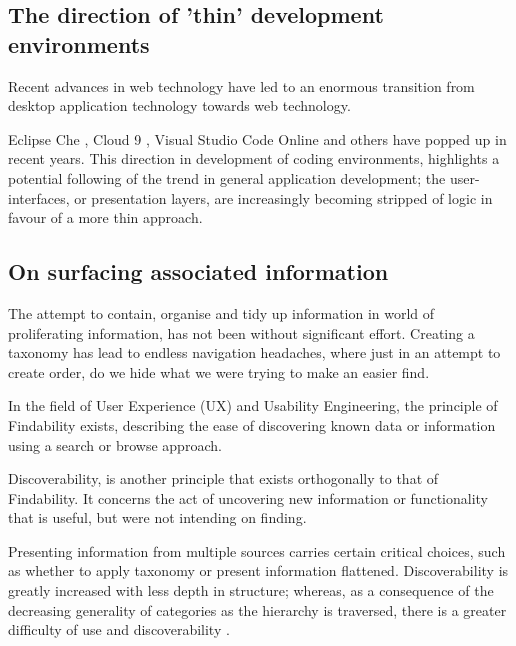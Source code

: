 \subsection{The direction of 'thin' development environments}

Recent advances in web technology have led to an enormous transition from desktop application technology towards web technology. 

Eclipse Che \parencite{eclipseChe}, Cloud 9 \parencite{amazonCloud9}, Visual Studio Code Online \parencite{vsCodeOnline} and others have popped up in recent years. This direction in development of coding environments, highlights a potential following of the trend in general application development; the user-interfaces, or presentation layers, are increasingly becoming stripped of logic in favour of a more thin approach. 

\subsection{On surfacing associated information}

The attempt to contain, organise and tidy up information in world of proliferating information, has not been without significant effort. Creating a taxonomy has lead to endless navigation headaches, where just in an attempt to create order, do we hide what we were trying to make an easier find. 

In the field of User Experience (UX) and Usability Engineering, the principle of Findability exists, describing the ease of discovering known data or information using a search or browse approach.

Discoverability, is another principle that exists orthogonally to that of Findability. It concerns the act of uncovering new information or functionality that is useful, but were not intending on finding.  

Presenting information from multiple sources carries certain critical choices, such as whether to apply taxonomy or present information flattened. Discoverability is greatly increased with less depth in structure; whereas, as a consequence of the decreasing generality of categories as the hierarchy is traversed, there is a greater difficulty of use and discoverability \parencite{nielsenNormanStructure}.

